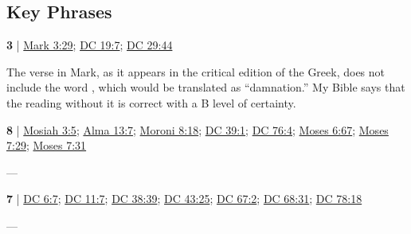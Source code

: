		
\subsection{Key Phrases} %
	\label{ETERNITY-PHRASES}

	\begin{compactdesc}
	
		\item[eternal damnation] \textbf{3} | \hyperref[MARK-3-29]{Mark 3:29}; \hyperref[DC19-7]{DC 19:7}; \hyperref[DC29-44]{DC 29:44}
			\begin{compactdesc}
				\item[Bible anchor verses] \phantom{.}
					\begin{compactdesc}
						\item[Mark 3:29] 
					\end{compactdesc}
				\item[Commentary] The verse in Mark, as it appears in the critical edition of the Greek, does not include the word , which would be translated as ``damnation.'' My Bible says that the reading without it is correct with a B level of certainty.
			\end{compactdesc}
			
		\item[eternity to eternity] \textbf{8} | \hyperref[MOSIAH-3-5]{Mosiah 3:5}; \hyperref[ALMA-13-7]{Alma 13:7}; \hyperref[MORONI-8-18]{Moroni 8:18}; \hyperref[DC39-1]{DC 39:1}; \hyperref[DC76-4]{DC 76:4}; \hyperref[MOSES-6-67]{Moses 6:67}; \hyperref[MOSES-7-29]{Moses 7:29}; \hyperref[MOSES-7-31]{Moses 7:31}
			\begin{compactdesc}
				\item[Bible anchor verses] ---
			\end{compactdesc}
			
		\item[riches of eternity] \textbf{7} | \hyperref[DC6-7]{DC 6:7}; \hyperref[DC11-7]{DC 11:7}; \hyperref[DC38-39]{DC 38:39}; \hyperref[DC43-25]{DC 43:25}; \hyperref[DC67-2]{DC 67:2}; \hyperref[DC68-31]{DC 68:31}; \hyperref[DC78-18]{DC 78:18}
			\begin{compactdesc}
				\item[Bible anchor verses] ---
			\end{compactdesc}
			

\end{compactdesc}
